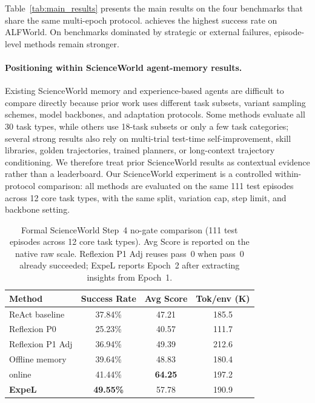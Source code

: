 Table~\ref{tab:main_results} presents the main results on the four benchmarks that share the same multi-epoch protocol. \method{} achieves the highest success rate on ALFWorld. On benchmarks dominated by strategic or external failures, episode-level methods remain stronger.

\paragraph{Positioning within ScienceWorld agent-memory results.}
Existing ScienceWorld memory and experience-based agents are difficult to compare directly because prior work uses different task subsets, variant sampling schemes, model backbones, and adaptation protocols. Some methods evaluate all 30 task types, while others use 18-task subsets or only a few task categories; several strong results also rely on multi-trial test-time self-improvement, skill libraries, golden trajectories, trained planners, or long-context trajectory conditioning. We therefore treat prior ScienceWorld results as contextual evidence rather than a leaderboard. Our ScienceWorld experiment is a controlled within-protocol comparison: all methods are evaluated on the same 111 test episodes across 12 core task types, with the same split, variation cap, step limit, and backbone setting.

\begin{table}[t]
\centering
\caption{Formal ScienceWorld Step~4 no-gate comparison (111 test episodes across 12 core task types). Avg Score is reported on the native raw scale. Reflexion P1 Adj reuses pass~0 when pass~0 already succeeded; ExpeL reports Epoch~2 after extracting insights from Epoch~1.}
\label{tab:sw_step4}
\small
\setlength{\tabcolsep}{4pt}
\begin{tabular}{lccc}
\toprule
Method & Success Rate & Avg Score & Tok/env (K) \\
\midrule
ReAct baseline & 37.84\% & 47.21 & 185.5 \\
Reflexion P0 & 25.23\% & 40.57 & 111.7 \\
Reflexion P1 Adj & 36.94\% & 49.39 & 212.6 \\
Offline memory & 39.64\% & 48.83 & 180.4 \\
\method{} online & 41.44\% & \textbf{64.25} & 197.2 \\
\textbf{ExpeL} & \textbf{49.55\%} & 57.78 & 190.9 \\
\bottomrule
\end{tabular}
\end{table}

